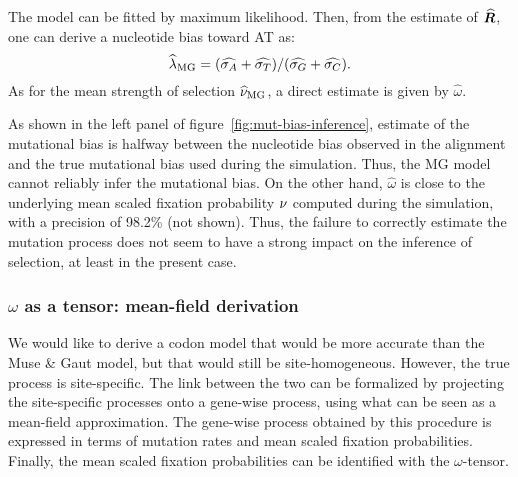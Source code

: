 The model can be fitted by maximum likelihood.
Then, from the estimate of $\widehat{\bm{R}}$, one can derive a nucleotide bias toward AT as:
\begin{equation}
    \widehat{\lambda}_{\text{MG}} = (\widehat{\sigma_A} +\widehat{\sigma_T}) /(\widehat{\sigma_G} +\widehat{\sigma_C}).\label{eq:lambda-R}
\end{equation}
As for the mean strength of selection $\widehat{\nu}_{\text{MG}}$, a direct estimate is given by $\widehat{\omega}$.

As shown in the left panel of figure~\ref{fig:mut-bias-inference}, estimate of the mutational bias is halfway between the nucleotide bias observed in the alignment and the true mutational bias used during the simulation.
Thus, the MG model cannot reliably infer the mutational bias.
On the other hand, $\widehat{\omega}$ is close to the underlying mean scaled fixation probability $\nu$ computed during the simulation, with a precision of 98.2\% (not shown).
Thus, the failure to correctly estimate the mutation process does not seem to have a strong impact on the inference of selection, at least in the present case.

\subsubsection{\texorpdfstring{$\omega$}{ω} as a tensor: mean-field derivation}

We would like to derive a codon model that would be more accurate than the Muse \& Gaut model, but that would still be site-homogeneous.
However, the true process is site-specific.
The link between the two can be formalized by projecting the site-specific processes onto a gene-wise process, using what can be seen as a mean-field approximation.
The gene-wise process obtained by this procedure is expressed in terms of mutation rates and mean scaled fixation probabilities.
Finally, the mean scaled fixation probabilities can be identified with the $\omega$-tensor.


